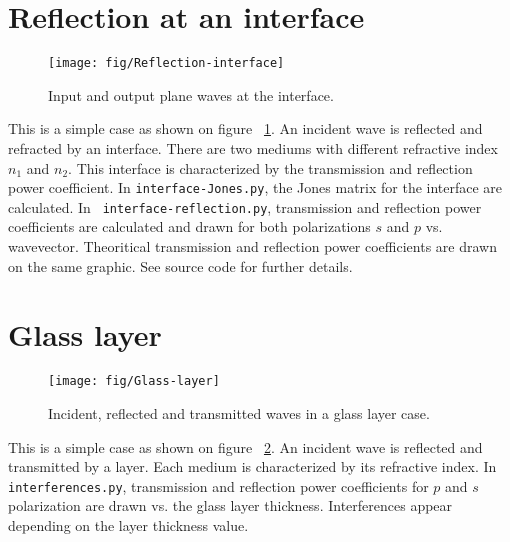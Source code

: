 

\section{Reflection at an interface}
\begin{figure}[!h]
\texttt{[image: fig/Reflection-interface]}
\caption{\label{fig:Reflection-interface}Input and output plane waves at the interface.}
\end{figure}
This is a simple case as shown on figure ~\ref{fig:Reflection-interface}. An incident wave is reflected and refracted by an interface. There are two mediums with different refractive index $n_1$ and $n_2$. This interface is characterized by the transmission and reflection power coefficient. In \verb/interface-Jones.py/, the Jones matrix for the interface are calculated. In \verb/ interface-reflection.py/, transmission and reflection power coefficients are calculated and drawn for both polarizations $s$ and $p$ vs. wavevector. Theoritical transmission and reflection power coefficients are drawn on the same graphic. See source code for further details.

\section{Glass layer}
\begin{figure}[!h]
\texttt{[image: fig/Glass-layer]}
\caption{\label{fig:Glass-layer}Incident, reflected and transmitted waves in a glass layer case.}
\end{figure}
This is a simple case as shown on figure ~\ref{fig:Glass-layer}. An incident wave is reflected and transmitted by a layer. Each medium is characterized by its refractive index.
In \verb/interferences.py/, transmission and reflection power coefficients for $p$ and $s$ polarization are drawn vs. the glass layer thickness. Interferences appear depending on the layer thickness value.



